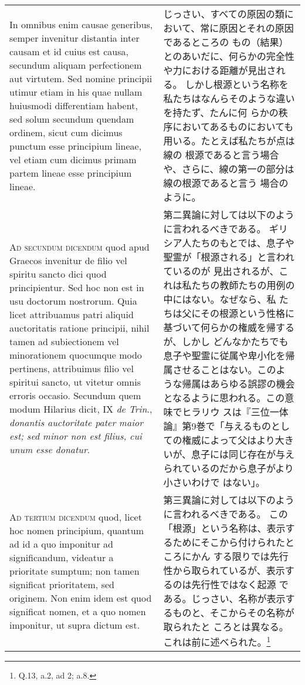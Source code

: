\documentclass[10pt]{jsarticle} %
\begin{document}
\begin{longtable}{p{21em}p{21em}}
\\


In omnibus enim causae generibus, semper
invenitur distantia inter causam et id cuius est causa, secundum
aliquam perfectionem aut virtutem. Sed nomine principii utimur etiam
in his quae nullam huiusmodi differentiam habent, sed solum secundum
quendam ordinem, sicut cum dicimus punctum esse principium lineae, vel
etiam cum dicimus primam partem lineae esse principium lineae.


&

じっさい、すべての原因の類において、常に原因とそれの原因であるところの
 もの（結果）とのあいだに、何らかの完全性や力における距離が見出される。
 しかし根源という名称を私たちはなんらそのような違いを持たず、たんに何
 らかの秩序においてあるものにおいても用いる。たとえば私たちが点は線の
 根源であると言う場合や、さらに、線の第一の部分は線の根源であると言う
 場合のように。


\\



{\scshape Ad secundum dicendum} quod apud Graecos invenitur de filio vel spiritu
sancto dici quod principientur. Sed hoc non est in usu doctorum
nostrorum. Quia licet attribuamus patri aliquid auctoritatis ratione
principii, nihil tamen ad subiectionem vel minorationem quocumque modo
pertinens, attribuimus filio vel spiritui sancto, ut vitetur omnis
erroris occasio. Secundum quem modum Hilarius dicit, IX {\itshape de Trin}.,
{\itshape donantis auctoritate pater maior est; sed minor non est filius, cui
unum esse donatur}.

&

第二異論に対しては以下のように言われるべきである。
ギリシア人たちのもとでは、息子や聖霊が「根源される」と言われているのが
 見出されるが、これは私たちの教師たちの用例の中にはない。なぜなら、私
 たちは父にその根源という性格に基づいて何らかの権威を帰するが、しかし
どんなかたちでも息子や聖霊に従属や卑小化を帰属させることはない。このよ
 うな帰属はあらゆる誤謬の機会となるように思われる。この意味でヒラリウ
 スは『三位一体論』第9巻で「与えるものとしての権威によって父はより大き
 いが、息子には同じ存在が与えられているのだから息子がより小さいわけで
 はない」。

\\



{\scshape Ad tertium dicendum} quod, licet hoc nomen principium, quantum ad id a
quo imponitur ad significandum, videatur a prioritate sumptum; non
tamen significat prioritatem, sed originem. Non enim idem est quod
significat nomen, et a quo nomen imponitur, ut supra dictum est.


&

第三異論に対しては以下のように言われるべきである。
この「根源」という名称は、表示するためにそこから付けられたところにかん
 する限りでは先行性から取られているが、表示するのは先行性ではなく起源
 である。じっさい、名称が表示するものと、そこからその名称が取られたと
 ころとは異なる。これは前に述べられた。\footnote{Q.13, a.2, ad 2; a.8.}


\\


\end{longtable}
\end{document}
